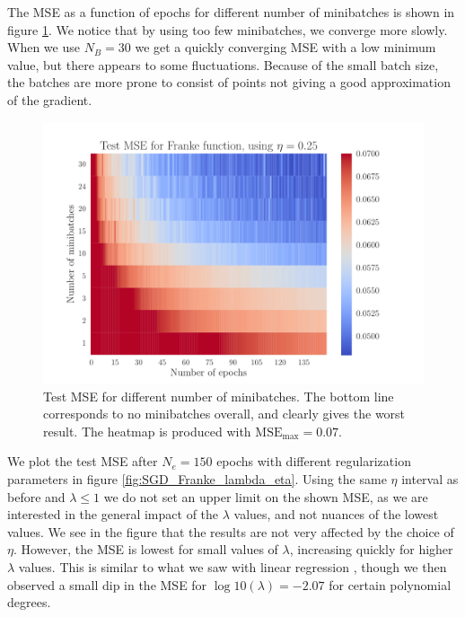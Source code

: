\documentclass[12pt]{extarticle}
\begin{document}
The MSE as a function of epochs for different number of minibatches is shown in figure \ref{fig:SGD_Franke_epochs_minibatches}. We notice that by using too few minibatches, we converge more slowly. When we use $N_B=30$ we get a quickly converging MSE with a low minimum value, but there appears to some fluctuations. Because of the small batch size, the batches are more prone to consist of points not giving a good approximation of the gradient.

\begin{figure}[h!]
	\includegraphics[width=0.9\linewidth]{SGD_Franke/reg_Franke__epochs_minibatches__Test_MSE__440533.pdf}
	\caption{Test MSE for different number of minibatches. The bottom line corresponds to no minibatches overall, and clearly gives the worst result. The heatmap is produced with $\mathrm{MSE}_\mathrm{max}=0.07$.}
	\label{fig:SGD_Franke_epochs_minibatches}
\end{figure}

We plot the test MSE after $N_e=150$ epochs with different regularization parameters in figure \ref{fig:SGD_Franke_lambda_eta}. Using the same $\eta$ interval as before and $\lambda\leq1$ we do not set an upper limit on the shown MSE, as we are interested in the general impact of the $\lambda$ values, and not nuances of the lowest values. We see in the figure that the results are not very affected by the choice of $\eta$. However, the MSE is lowest for small values of $\lambda$, increasing quickly for higher $\lambda$ values. This is similar to what we saw with linear regression \cite{project1}, though we then observed a small dip in the MSE for $\log10(\lambda)=-2.07$ for certain polynomial degrees.
\end{document}
